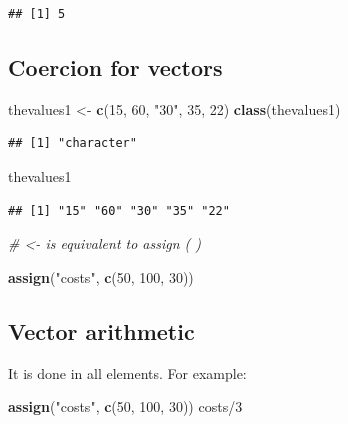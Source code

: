 \documentclass[]{book}
\newenvironment{Shaded}{\begin{snugshade}}{\end{snugshade}}
\newcommand{\KeywordTok}[1]{\textcolor[rgb]{0.13,0.29,0.53}{\textbf{{#1}}}}
\newcommand{\DecValTok}[1]{\textcolor[rgb]{0.00,0.00,0.81}{{#1}}}
\newcommand{\StringTok}[1]{\textcolor[rgb]{0.31,0.60,0.02}{{#1}}}
\newcommand{\CommentTok}[1]{\textcolor[rgb]{0.56,0.35,0.01}{\textit{{#1}}}}
\newcommand{\NormalTok}[1]{{#1}}
\begin{document}
\begin{verbatim}
## [1] 5
\end{verbatim}

\subsection{Coercion for vectors}\label{coercion-for-vectors}

\begin{Shaded}
\begin{Highlighting}[]
\NormalTok{thevalues1 <-}\StringTok{ }\KeywordTok{c}\NormalTok{(}\DecValTok{15}\NormalTok{, }\DecValTok{60}\NormalTok{, }\StringTok{"30"}\NormalTok{, }\DecValTok{35}\NormalTok{, }\DecValTok{22}\NormalTok{)}
\KeywordTok{class}\NormalTok{(thevalues1)}
\end{Highlighting}
\end{Shaded}

\begin{verbatim}
## [1] "character"
\end{verbatim}

\begin{Shaded}
\begin{Highlighting}[]
\NormalTok{thevalues1}
\end{Highlighting}
\end{Shaded}

\begin{verbatim}
## [1] "15" "60" "30" "35" "22"
\end{verbatim}

\begin{Shaded}
\begin{Highlighting}[]
\CommentTok{# <-  is equivalent to   assign ( )}

\KeywordTok{assign}\NormalTok{(}\StringTok{"costs"}\NormalTok{, }\KeywordTok{c}\NormalTok{(}\DecValTok{50}\NormalTok{, }\DecValTok{100}\NormalTok{, }\DecValTok{30}\NormalTok{))}
\end{Highlighting}
\end{Shaded}

\subsection{Vector arithmetic}\label{vector-arithmetic}

It is done in all elements. For example:

\begin{Shaded}
\begin{Highlighting}[]
\KeywordTok{assign}\NormalTok{(}\StringTok{"costs"}\NormalTok{, }\KeywordTok{c}\NormalTok{(}\DecValTok{50}\NormalTok{, }\DecValTok{100}\NormalTok{, }\DecValTok{30}\NormalTok{))}
\NormalTok{costs/}\DecValTok{3}
\end{Highlighting}
\end{Shaded}
\end{document}
